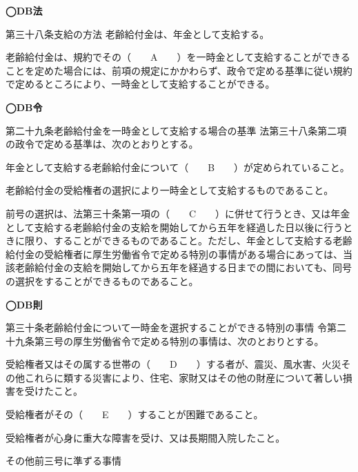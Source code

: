 \begin{fillblank}[年金1 H28 問題1(1)]
  \noindent \textbf{◯DB法}
  \begin{lawstructure}
    \begin{lawarticle}{第三十八条}{支給の方法}
      老齢給付金は、年金として支給する。

      老齢給付金は、規約でその（　　A　　）を一時金として支給することができることを定めた場合には、前項の規定にかかわらず、政令で定める基準に従い規約で定めるところにより、一時金として支給することができる。
    \end{lawarticle}
  \end{lawstructure}
  
  \noindent \textbf{◯DB令}
  \begin{lawstructure}
    \begin{lawarticle}{第二十九条}{老齢給付金を一時金として支給する場合の基準}
      法第三十八条第二項の政令で定める基準は、次のとおりとする。

        年金として支給する老齢給付金について（　　B　　）が定められていること。
      
      老齢給付金の受給権者の選択により一時金として支給するものであること。

      前号の選択は、法第三十条第一項の（　　C　　）に併せて行うとき、又は年金として支給する老齢給付金の支給を開始してから五年を経過した日以後に行うときに限り、することができるものであること。ただし、年金として支給する老齢給付金の受給権者に厚生労働省令で定める特別の事情がある場合にあっては、当該老齢給付金の支給を開始してから五年を経過する日までの間においても、同号の選択をすることができるものであること。

    \end{lawarticle}
  \end{lawstructure}

  \noindent \textbf{◯DB則}
  \begin{lawstructure}
    \begin{lawarticle}{第三十条}{老齢給付金について一時金を選択することができる特別の事情}
      令第二十九条第三号の厚生労働省令で定める特別の事情は、次のとおりとする。

      受給権者又はその属する世帯の（　　D　　）する者が、震災、風水害、火災その他これらに類する災害により、住宅、家財又はその他の財産について著しい損害を受けたこと。

      受給権者がその（　　E　　）することが困難であること。

      受給権者が心身に重大な障害を受け、又は長期間入院したこと。

      その他前三号に準ずる事情

    \end{lawarticle}
  \end{lawstructure}
\end{fillblank}

